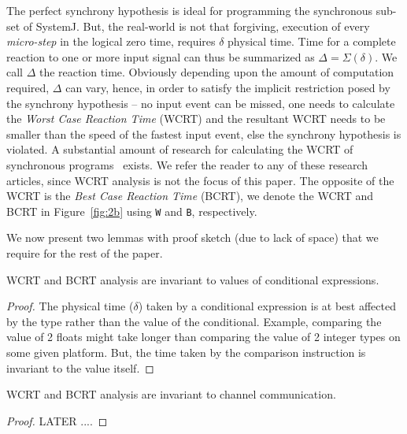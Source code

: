 The perfect synchrony hypothesis is ideal for programming the
synchronous sub-set of SystemJ. But, the real-world is not that
forgiving, execution of every \textit{micro-step} in the logical zero
time, requires $\delta$ physical time. Time for a complete reaction to
one or more input signal can thus be summarized as $\Delta = \Sigma
(\delta)$. We call $\Delta$ the reaction time. Obviously depending upon
the amount of computation required, $\Delta$ can vary, hence, in order
to satisfy the implicit restriction posed by the synchrony hypothesis --
no input event can be missed, one needs to calculate the \textit{Worst
  Case Reaction Time} (WCRT) and the resultant WCRT needs to be smaller
than the speed of the fastest input event, else the synchrony hypothesis
is violated. A substantial amount of research for calculating the WCRT
of synchronous programs~\cite{proop10,boldt07,wilhelm08} exists. We
refer the reader to any of these research articles, since WCRT analysis
is not the focus of this paper. The opposite of the WCRT is the
\textit{Best Case Reaction Time} (BCRT), we denote the WCRT and BCRT in
Figure~\ref{fig:2b} using \texttt{W} and \texttt{B}, respectively.

We now present two lemmas with proof sketch (due to lack of space) that
we require for the rest of the paper.

\begin{lemma}
  WCRT and BCRT analysis are invariant to values of conditional
  expressions.
\end{lemma}

\begin{proof}
  The physical time ($\delta$) taken by a conditional expression is at
  best affected by the type rather than the value of the
  conditional. Example, comparing the value of 2 floats might take
  longer than comparing the value of 2 integer types on some given
  platform. But, the time taken by the comparison instruction is
  invariant to the value itself.
\end{proof}

\begin{lemma}
  WCRT and BCRT analysis are invariant to channel communication.
\end{lemma}
\begin{proof}
  LATER ....
\end{proof}


